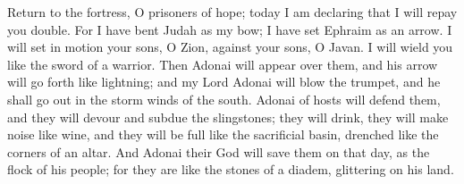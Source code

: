 \begin{biblechapter}
\verse Return to the fortress, 
O prisoners of hope; 
today I am declaring that I will repay you double.
\verse For I have bent Judah as my bow; 
I have set Ephraim as an arrow. 
I will set in motion your sons, O Zion, 
against your sons, O Javan. 
I will wield you like the sword of a warrior.
\verse Then Adonai will appear over them, 
and his arrow will go forth like lightning; 
and my Lord Adonai will blow the trumpet, 
and he shall go out in the storm winds of the south.
\verse Adonai of hosts will defend them, 
and they will devour and subdue the slingstones; 
they will drink, they will make noise like wine, 
and they will be full like the sacrificial basin, 
drenched like the corners of an altar.
\verse And Adonai their God will save them on that day, 
as the flock of his people; 
for they are like the stones of a diadem, 
glittering on his land.
\end{biblechapter}

